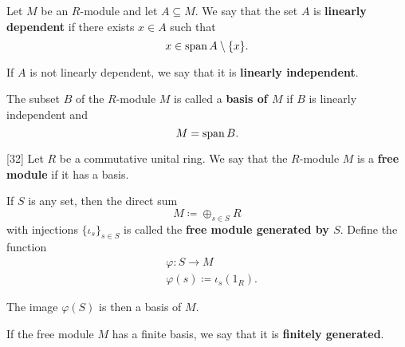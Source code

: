 \begin{definition}\label{def:linear_dependence}
  Let \( M \) be an \( R \)-module and let \( A \subseteq M \). We say that the set \( A \) is \textbf{linearly dependent} if there exists \( x \in A \) such that
  \begin{equation*}
    x \in \operatorname{span}{A} \setminus \{ x \}.
  \end{equation*}

  If \( A \) is not linearly dependent, we say that it is \textbf{linearly independent}.
\end{definition}

\begin{definition}\label{def:module_basis}
  The subset \( B \) of the \( R \)-module \( M \) is called a \textbf{basis of \( M \)} if \( B \) is linearly independent and
  \begin{equation*}
    M = \operatorname{span}{B}.
  \end{equation*}
\end{definition}

\begin{definition}\label{def:free_module}[32]\cite{Kocev2016}
  Let \( R \) be a commutative unital ring. We say that the \( R \)-module \( M \) is a \textbf{free module} if it has a basis.

  If \( S \) is any set, then the direct sum
  \begin{equation*}
    M \coloneqq \oplus_{s \in S} R
  \end{equation*}
  with injections \( \{ \iota_s \}_{s \in S} \) is called the \textbf{free module generated by \( S \)}. Define the function
  \begin{align*}
    &\varphi: S \to M \\
    &\varphi(s) \coloneqq \iota_s(1_R).
  \end{align*}

  The image \( \varphi(S) \) is then a basis of \( M \).

  If the free module \( M \) has a finite basis, we say that it is \textbf{finitely generated}.
\end{definition}

